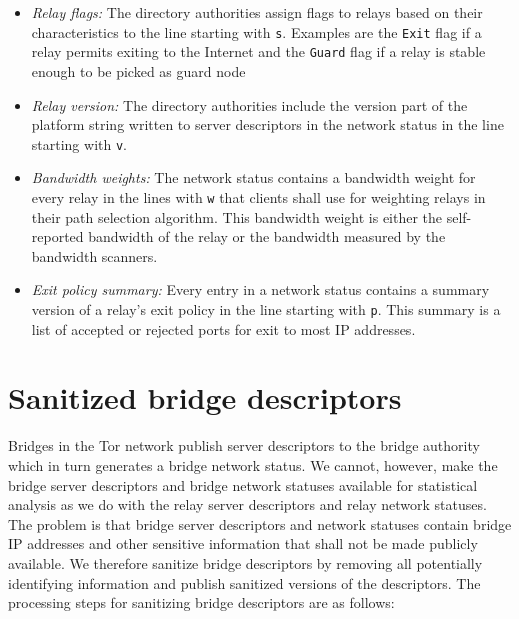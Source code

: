 \documentclass{article}
\begin{document}
\begin{itemize}
\item \textit{Relay flags:} The directory authorities assign flags to
relays based on their characteristics to the line starting with \verb+s+.
Examples are the \verb+Exit+ flag if a relay permits exiting to the
Internet and the \verb+Guard+ flag if a relay is stable enough to be
picked as guard node
\item \textit{Relay version:} The directory authorities include the
version part of the platform string written to server descriptors in the
network status in the line starting with \verb+v+.
\item \textit{Bandwidth weights:} The network status contains a bandwidth
weight for every relay in the lines with \verb+w+ that clients shall use
for weighting relays in their path selection algorithm.
This bandwidth weight is either the self-reported bandwidth of the relay
or the bandwidth measured by the bandwidth scanners.
\item \textit{Exit policy summary:} Every entry in a network status
contains a summary version of a relay's exit policy in the line starting
with \verb+p+.
This summary is a list of accepted or rejected ports for exit to most IP
addresses.
\end{itemize}

\section{Sanitized bridge descriptors}
\label{sec:bridgesan}

Bridges in the Tor network publish server descriptors to the bridge
authority which in turn generates a bridge network status.
We cannot, however, make the bridge server descriptors and bridge network
statuses available for statistical analysis as we do with the relay server
descriptors and relay network statuses.
The problem is that bridge server descriptors and network statuses contain
bridge IP addresses and other sensitive information that shall not be made
publicly available.
We therefore sanitize bridge descriptors by removing all potentially
identifying information and publish sanitized versions of the descriptors.
The processing steps for sanitizing bridge descriptors are as follows:
\end{document}
